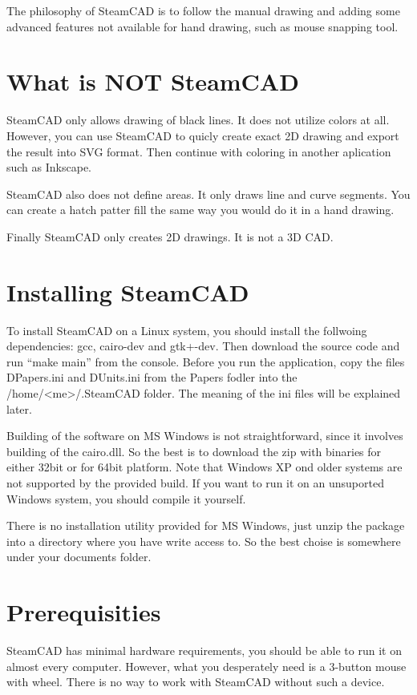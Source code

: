 The philosophy of SteamCAD is to follow the manual drawing and adding some advanced features
not available for hand drawing, such as mouse snapping tool.

\section{What is NOT SteamCAD}

SteamCAD only allows drawing of black lines. It does not utilize colors at all. However, you can
use SteamCAD to quicly create exact 2D drawing and export the result into SVG format. Then
continue with coloring in another aplication such as Inkscape.

SteamCAD also does not define areas. It only draws line and curve segments. You can create a
hatch patter fill the same way you would do it in a hand drawing.

Finally SteamCAD only creates 2D drawings. It is not a 3D CAD.

\section{Installing SteamCAD}

To install SteamCAD on a Linux system, you should install the follwoing dependencies: gcc, cairo-dev
and gtk+-dev. Then download the source code and run ``make main'' from the console. Before you run
the application, copy the files DPapers.ini and DUnits.ini from the Papers fodler into the
/home/<me>/.SteamCAD folder. The meaning of the ini files will be explained later.

Building of the software on MS Windows is not straightforward, since it involves building of
the cairo.dll. So the best is to download the zip with binaries for either 32bit or for 64bit
platform. Note that Windows XP ond older systems are not supported by the provided build. If
you want to run it on an unsuported Windows system, you should compile it yourself.

There is no installation utility provided for MS Windows, just unzip the package into a directory
where you have write access to. So the best choise is somewhere under your documents folder.

\section{Prerequisities}

SteamCAD has minimal hardware requirements, you should be able to run it on almost every
computer. However, what you desperately need is a 3-button mouse with wheel. There is no way
to work with SteamCAD without such a device.

